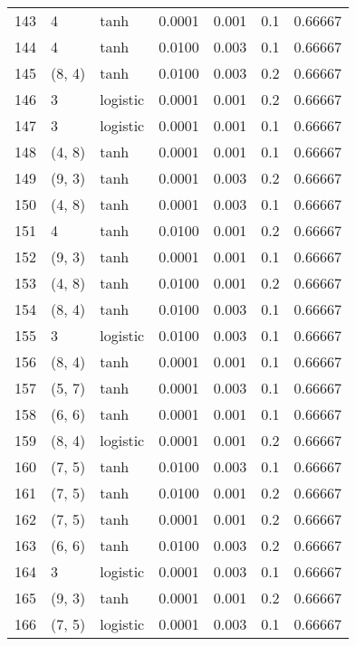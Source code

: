 \begin{tabular}{lllrrrr}
143 &           4 &      tanh &  0.0001 &  0.001 &  0.1 &   0.66667 \\
144 &           4 &      tanh &  0.0100 &  0.003 &  0.1 &   0.66667 \\
145 &      (8, 4) &      tanh &  0.0100 &  0.003 &  0.2 &   0.66667 \\
146 &           3 &  logistic &  0.0001 &  0.001 &  0.2 &   0.66667 \\
147 &           3 &  logistic &  0.0001 &  0.001 &  0.1 &   0.66667 \\
148 &      (4, 8) &      tanh &  0.0001 &  0.001 &  0.1 &   0.66667 \\
149 &      (9, 3) &      tanh &  0.0001 &  0.003 &  0.2 &   0.66667 \\
150 &      (4, 8) &      tanh &  0.0001 &  0.003 &  0.1 &   0.66667 \\
151 &           4 &      tanh &  0.0100 &  0.001 &  0.2 &   0.66667 \\
152 &      (9, 3) &      tanh &  0.0001 &  0.001 &  0.1 &   0.66667 \\
153 &      (4, 8) &      tanh &  0.0100 &  0.001 &  0.2 &   0.66667 \\
154 &      (8, 4) &      tanh &  0.0100 &  0.003 &  0.1 &   0.66667 \\
155 &           3 &  logistic &  0.0100 &  0.003 &  0.1 &   0.66667 \\
156 &      (8, 4) &      tanh &  0.0001 &  0.001 &  0.1 &   0.66667 \\
157 &      (5, 7) &      tanh &  0.0001 &  0.003 &  0.1 &   0.66667 \\
158 &      (6, 6) &      tanh &  0.0001 &  0.001 &  0.1 &   0.66667 \\
159 &      (8, 4) &  logistic &  0.0001 &  0.001 &  0.2 &   0.66667 \\
160 &      (7, 5) &      tanh &  0.0100 &  0.003 &  0.1 &   0.66667 \\
161 &      (7, 5) &      tanh &  0.0100 &  0.001 &  0.2 &   0.66667 \\
162 &      (7, 5) &      tanh &  0.0001 &  0.001 &  0.2 &   0.66667 \\
163 &      (6, 6) &      tanh &  0.0100 &  0.003 &  0.2 &   0.66667 \\
164 &           3 &  logistic &  0.0001 &  0.003 &  0.1 &   0.66667 \\
165 &      (9, 3) &      tanh &  0.0001 &  0.001 &  0.2 &   0.66667 \\
166 &      (7, 5) &  logistic &  0.0001 &  0.003 &  0.1 &   0.66667 \\

\end{tabular}
